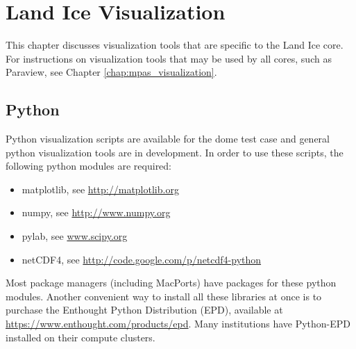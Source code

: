 \chapter{Land Ice Visualization}
\label{chap:landice_visualization}

This chapter discusses visualization tools that are specific to the Land Ice core.  For instructions on visualization tools that may be used by all cores, such as Paraview, see Chapter \ref{chap:mpas_visualization}.

\section{Python}
\label{sec:landice_python}

Python visualization scripts are available for the dome test case and general python visualization tools are in development.  In order to use these scripts, the following python modules are required:
\begin{itemize}
\item matplotlib, see \url{http://matplotlib.org}
\item numpy, see \url{http://www.numpy.org}
\item pylab, see \url{www.scipy.org}
\item netCDF4, see \url{http://code.google.com/p/netcdf4-python}
\end{itemize}
Most package managers (including MacPorts) have packages for these python modules. 
Another convenient way to install all these libraries at once is to purchase the Enthought Python Distribution (EPD), available at \url{https://www.enthought.com/products/epd}.  
Many institutions have Python-EPD installed on their compute clusters.

